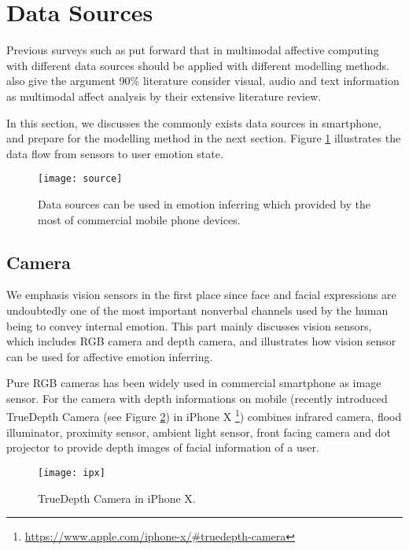 \section{Data Sources}\label{sec:source}

Previous surveys such as  \cite{Tao2005, Zhang2014, Poria2017, Garcia-Garcia2017} put forward that in multimodal affective computing with different data sources should be applied with different modelling methods. \cite{Poria2017} also give the argument 90\% literature consider visual, audio and text information as multimodal affect analysis by their extensive literature review.

In this section, we discusses the commonly exists data sources in smartphone, and prepare for the modelling method in the next section. Figure \ref{fig:source} illustrates the data flow from sensors to user emotion state.

\begin{figure}
    \centering
    \texttt{[image: source]}
    \caption{Data sources can be used in emotion inferring which provided by the most of commercial mobile phone devices.}
    \label{fig:source}
\end{figure}

\subsection{Camera}\label{subsec:vision}
We emphasis vision sensors in the first place since face and facial expressions are undoubtedly one of the most important nonverbal channels used by the human being to convey internal emotion. This part mainly discusses vision sensors, which includes RGB camera and depth camera, and illustrates how vision sensor can be used for affective emotion inferring.

Pure RGB cameras has been widely used in commercial smartphone as image sensor. 
For the camera with depth informations on mobile (recently introduced TrueDepth Camera (see Figure \ref{fig:ipx}) in iPhone X \footnote{\url{https://www.apple.com/iphone-x/\#truedepth-camera}}) combines infrared camera, flood illuminator, proximity sensor, ambient light sensor, front facing camera and dot projector to provide depth images of facial information of a user.

\begin{figure}
    \centering
    \texttt{[image: ipx]}
    \caption{TrueDepth Camera in iPhone X.}
    \label{fig:ipx}
\end{figure}

